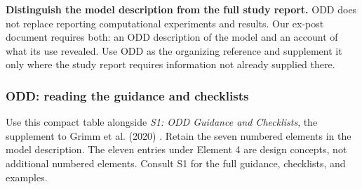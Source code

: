 \documentclass[11pt,a4paper]{article}
\begin{document}
\textbf{Distinguish the model description from the full study report.} ODD does not replace reporting computational experiments and results. Our ex-post document requires both: an ODD description of the model and an account of what its use revealed. Use ODD as the organizing reference and supplement it only where the study report requires information not already supplied there.

\subsubsection{ODD: reading the guidance and checklists}

Use this compact table alongside \emph{S1: ODD Guidance and Checklists}, the supplement to Grimm et al. (2020) \cite{grimm_odd_2020}. Retain the seven numbered elements in the model description. The eleven entries under Element 4 are design concepts, not additional numbered elements. Consult S1 for the full guidance, checklists, and examples.
\end{document}
